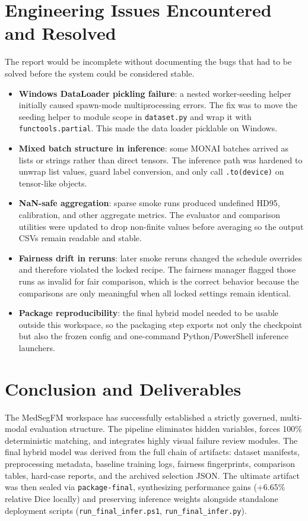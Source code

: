 \documentclass[11pt,a4paper]{article}
\begin{document}
\section{Engineering Issues Encountered and Resolved}
The report would be incomplete without documenting the bugs that had to be solved before the system could be considered stable.

\begin{itemize}[leftmargin=1.5em]
    \item \textbf{Windows DataLoader pickling failure}: a nested worker-seeding helper initially caused spawn-mode multiprocessing errors. The fix was to move the seeding helper to module scope in \texttt{dataset.py} and wrap it with \texttt{functools.partial}. This made the data loader picklable on Windows.
    \item \textbf{Mixed batch structure in inference}: some MONAI batches arrived as lists or strings rather than direct tensors. The inference path was hardened to unwrap list values, guard label conversion, and only call \texttt{.to(device)} on tensor-like objects.
    \item \textbf{NaN-safe aggregation}: sparse smoke runs produced undefined HD95, calibration, and other aggregate metrics. The evaluator and comparison utilities were updated to drop non-finite values before averaging so the output CSVs remain readable and stable.
    \item \textbf{Fairness drift in reruns}: later smoke reruns changed the schedule overrides and therefore violated the locked recipe. The fairness manager flagged those runs as invalid for fair comparison, which is the correct behavior because the comparisons are only meaningful when all locked settings remain identical.
    \item \textbf{Package reproducibility}: the final hybrid model needed to be usable outside this workspace, so the packaging step exports not only the checkpoint but also the frozen config and one-command Python/PowerShell inference launchers.
\end{itemize}

\section{Conclusion and Deliverables}
The MedSegFM workspace has successfully established a strictly governed, multi-modal evaluation structure. The pipeline eliminates hidden variables, forces 100\% deterministic matching, and integrates highly visual failure review modules. The final hybrid model was derived from the full chain of artifacts: dataset manifests, preprocessing metadata, baseline training logs, fairness fingerprints, comparison tables, hard-case reports, and the archived selection JSON. The ultimate artifact was then sealed via \texttt{package-final}, synthesizing performance gains (+6.65\% relative Dice locally) and preserving inference weights alongside standalone deployment scripts (\texttt{run\_final\_infer.ps1}, \texttt{run\_final\_infer.py}).
\end{document}
